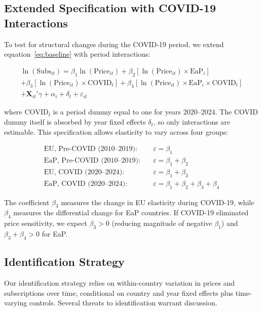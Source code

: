 \subsection{Extended Specification with COVID-19 Interactions}

To test for structural changes during the COVID-19 period, we extend equation~\eqref{eq:baseline} with period interactions:

\begin{multline}
\label{eq:covid}
\ln(\text{Subs}_{it}) = \beta_1 \ln(\text{Price}_{it}) + \beta_2 [\ln(\text{Price}_{it}) \times \text{EaP}_i] \\
+ \beta_3 [\ln(\text{Price}_{it}) \times \text{COVID}_t] + \beta_4 [\ln(\text{Price}_{it}) \times \text{EaP}_i \times \text{COVID}_t] \\
+ \mathbf{X}_{it}'\gamma + \alpha_i + \delta_t + \varepsilon_{it}
\end{multline}

where $\text{COVID}_t$ is a period dummy equal to one for years 2020--2024. The COVID dummy itself is absorbed by year fixed effects $\delta_t$, so only interactions are estimable. This specification allows elasticity to vary across four groups:

\begin{align*}
\text{EU, Pre-COVID (2010--2019):} \quad & \varepsilon = \beta_1 \\
\text{EaP, Pre-COVID (2010--2019):} \quad & \varepsilon = \beta_1 + \beta_2 \\
\text{EU, COVID (2020--2024):} \quad & \varepsilon = \beta_1 + \beta_3 \\
\text{EaP, COVID (2020--2024):} \quad & \varepsilon = \beta_1 + \beta_2 + \beta_3 + \beta_4
\end{align*}

The coefficient $\beta_3$ measures the change in EU elasticity during COVID-19, while $\beta_4$ measures the differential change for EaP countries. If COVID-19 eliminated price sensitivity, we expect $\beta_3 > 0$ (reducing magnitude of negative $\beta_1$) and $\beta_3 + \beta_4 > 0$ for EaP.

\subsection{Identification Strategy}

Our identification strategy relies on within-country variation in prices and subscriptions over time, conditional on country and year fixed effects plus time-varying controls. Several threats to identification warrant discussion.


